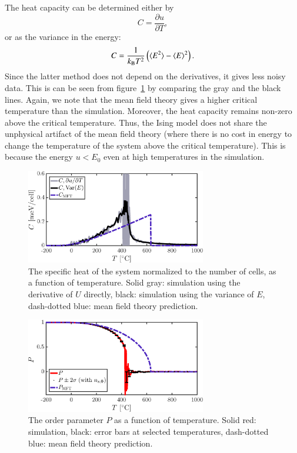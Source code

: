The heat capacity can be determined either by 
\begin{equation}
C = \frac{\partial u}{\partial T},
\label{eq:C1}
\end{equation}
or as the variance in the energy:
\begin{equation}
C = \frac{1}{k_{\rm B} T^2}\left(\langle E^2 \rangle  - \langle E \rangle^2 \right)
\label{eq:C2}.
\end{equation}
Since the latter method does not depend on the derivatives, it gives less noisy data. This is can be seen from figure~\ref{fig:C} by comparing the gray and the black lines. Again, we note that the mean field theory gives a higher critical temperature than the simulation. Moreover, the heat capacity remains non-zero above the critical temperature. Thus, the Ising model does not share  the unphysical artifact of the mean field theory (where there is no cost in energy to change the temperature of the system above the critical temperature). This is because the energy $u < E_0$ even at high temperatures in the simulation. 

\begin{figure}[!ht]
\begin{center}
  \includegraphics[width=0.7\textwidth]{../figures/C} 
  \caption{The specific heat of the system normalized to the number of cells, as a function of temperature. Solid gray: simulation using the derivative of $U$ directly, black: simulation using the variance of $E$, dash-dotted blue: mean field theory prediction.}
  \label{fig:C}
\end{center}
\end{figure}

\begin{figure}[!ht]
\begin{center}
  \includegraphics[width=0.7\textwidth]{../figures/P} 
  \caption{The order parameter $P$ as a function of temperature. Solid red: simulation, black: error bars at selected temperatures, dash-dotted blue: mean field theory prediction.}
  \label{fig:P}
\end{center}
\end{figure}

